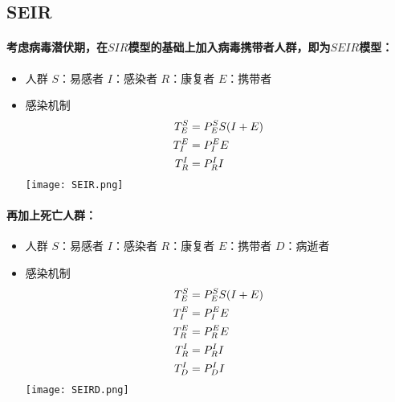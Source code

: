 \subsection{SEIR}
\paragraph{考虑病毒潜伏期，在$SIR$模型的基础上加入病毒携带者人群，即为$SEIR$模型：}
\begin{itemize}
	\item 人群
	      \subitem $S$：易感者
	      \subitem $I$：感染者
	      \subitem $R$：康复者
	      \subitem $E$：携带者
	\item 感染机制
	      \subitem
	      \begin{align}
		      T^{S}_{E}&=P^{S}_{E}S(I+E) \\
		      T^{E}_{I}&=P^{E}_{I}E      \\
		      T^{I}_{R}&=P^{I}_{R}I
	      \end{align}
	      \texttt{[image: SEIR.png]}
\end{itemize}
\paragraph{再加上死亡人群：}
\begin{itemize}
	\item 人群
	      \subitem $S$：易感者
	      \subitem $I$：感染者
	      \subitem $R$：康复者
	      \subitem $E$：携带者
	      \subitem $D$：病逝者
	\item 感染机制
	      \subitem
	      \begin{align}
		      T^{S}_{E}&=P^{S}_{E}S(I+E) \\
		      T^{E}_{I}&=P^{E}_{I}E      \\
		      T^{E}_{R}&=P^{E}_{R}E      \\
		      T^{I}_{R}&=P^{I}_{R}I      \\
		      T^{I}_{D}&=P^{I}_{D}I
	      \end{align}
	      \texttt{[image: SEIRD.png]}
\end{itemize}